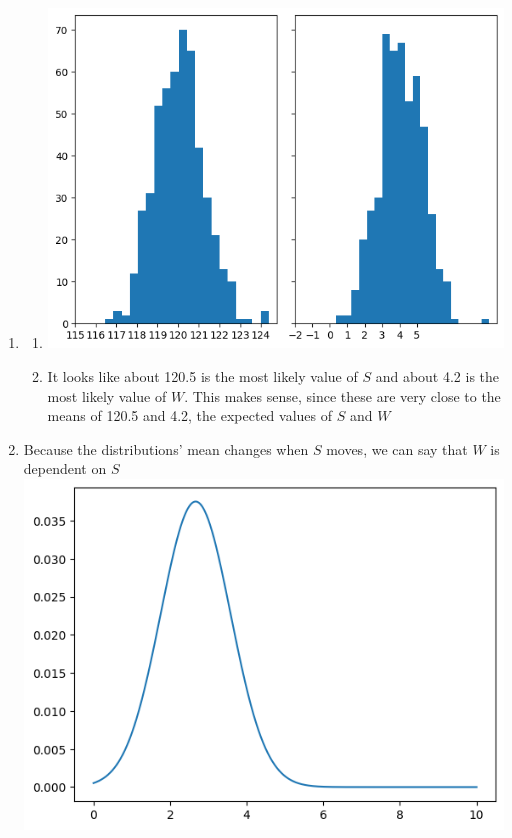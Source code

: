 \documentclass{harvardml}
\theoremstyle{definition}
\theoremstyle{plain}
\begin{document}
\begin{enumerate}
    \item 
    \newline
    \begin{enumerate}
    \item \includegraphics[scale=0.5]{hw0/biv_gaus.png}
    \item    It looks like about 120.5 is the most likely value of $S$ and about 4.2 is the most likely value of $W$. This makes sense, since these are very close to the means of 120.5 and 4.2, the expected values of $S$ and $W$
    \end{enumerate}
    \item Because the distributions' mean changes when $S$ moves, we can say that $W$ is dependent on $S$
    \includegraphics[scale=0.5]{hw0/s118.png}

\end{enumerate}
\end{document}
